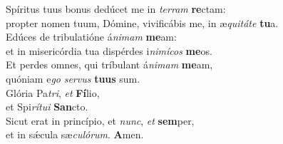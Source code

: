 \evenverse Spíritus tuus bonus dedúcet me in \textit{ter}\textit{ram} \textbf{re}ctam:~\*\\
\evenverse propter nomen tuum, Dómine, vivificábis me, in æ\textit{qui}\textit{tá}\textit{te} \textbf{tu}a.\\
\oddverse Edúces de tribulatióne á\textit{ni}\textit{mam} \textbf{me}am:~\*\\
\oddverse et in misericórdia tua dispérdes i\textit{ni}\textit{mí}\textit{cos} \textbf{me}os.\\
\evenverse Et perdes omnes, qui tríbulant á\textit{ni}\textit{mam} \textbf{me}am,~\*\\
\evenverse quóniam e\textit{go} \textit{ser}\textit{vus} \textbf{tu}\textbf{us} sum.\\
\oddverse Glória Pa\textit{tri}, \textit{et} \textbf{Fí}lio,~\*\\
\oddverse et Spi\textit{rí}\textit{tu}\textit{i} \textbf{San}cto.\\
\evenverse Sicut erat in princípio, et \textit{nunc}, \textit{et} \textbf{sem}per,~\*\\
\evenverse et in sǽcula sæ\textit{cu}\textit{ló}\textit{rum}. \textbf{A}men.\\
